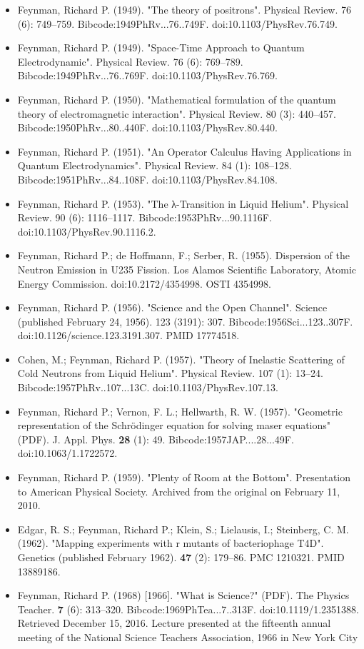 \begin{itemize}
\item Feynman, Richard P. (1949). "The theory of positrons". Physical Review. 76 (6): 749–759. Bibcode:1949PhRv...76..749F. doi:10.1103/PhysRev.76.749.
\item Feynman, Richard P. (1949). "Space-Time Approach to Quantum Electrodynamic". Physical Review. 76 (6): 769–789. Bibcode:1949PhRv...76..769F. doi:10.1103/PhysRev.76.769.
\item Feynman, Richard P. (1950). "Mathematical formulation of the quantum theory of electromagnetic interaction". Physical Review. 80 (3): 440–457. Bibcode:1950PhRv...80..440F. doi:10.1103/PhysRev.80.440.
\item Feynman, Richard P. (1951). "An Operator Calculus Having Applications in Quantum Electrodynamics". Physical Review. 84 (1): 108–128. Bibcode:1951PhRv...84..108F. doi:10.1103/PhysRev.84.108.
\item Feynman, Richard P. (1953). "The λ-Transition in Liquid Helium". Physical Review. 90 (6): 1116–1117. Bibcode:1953PhRv...90.1116F. doi:10.1103/PhysRev.90.1116.2.
\item Feynman, Richard P.; de Hoffmann, F.; Serber, R. (1955). Dispersion of the Neutron Emission in U235 Fission. Los Alamos Scientific Laboratory, Atomic Energy Commission. doi:10.2172/4354998. OSTI 4354998.
\item Feynman, Richard P. (1956). "Science and the Open Channel". Science (published February 24, 1956). 123 (3191): 307. Bibcode:1956Sci...123..307F. doi:10.1126/science.123.3191.307. PMID 17774518.
\item Cohen, M.; Feynman, Richard P. (1957). "Theory of Inelastic Scattering of Cold Neutrons from Liquid Helium". Physical Review. 107 (1): 13–24. Bibcode:1957PhRv..107...13C. doi:10.1103/PhysRev.107.13.
\item Feynman, Richard P.; Vernon, F. L.; Hellwarth, R. W. (1957). "Geometric representation of the Schrödinger equation for solving maser equations" (PDF). J. Appl. Phys. \textbf{28} (1): 49. Bibcode:1957JAP....28...49F. doi:10.1063/1.1722572.
\item Feynman, Richard P. (1959). "Plenty of Room at the Bottom". Presentation to American Physical Society. Archived from the original on February 11, 2010.
\item Edgar, R. S.; Feynman, Richard P.; Klein, S.; Lielausis, I.; Steinberg, C. M. (1962). "Mapping experiments with r mutants of bacteriophage T4D". Genetics (published February 1962). \textbf{47} (2): 179–86. PMC 1210321. PMID 13889186.
\item Feynman, Richard P. (1968) [1966]. "What is Science?" (PDF). The Physics Teacher. \textbf{7} (6): 313–320. Bibcode:1969PhTea...7..313F. doi:10.1119/1.2351388. Retrieved December 15, 2016. Lecture presented at the fifteenth annual meeting of the National Science Teachers Association, 1966 in New York City

\end{itemize}
